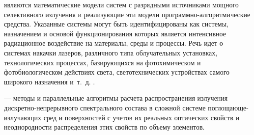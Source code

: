 




 являются математические модели систем с разрядными источниками мощного селективного излучения и реализующие эти модели программно-алгоритмические средства.
Указанные системы могут быть идентифицированы как системы, назначением и основой функционирования которых является интенсивное радиационное воздействие на материалы, среды и процессы.
Речь идет о системах накачки лазеров, различного типа облучательных установках, технологических процессах, базирующихся на фотохимическом и фотобиологическом действиях света, светотехнических устройствах самого широкого назначения и~т.~д. \cite{article-1-marshak, article-2-hancock, article-3-moreau}.

 — методы и параллельные алгоритмы расчета распространения излучения дискретно-непрерывного спектрального состава в сложной системе поглощающе-излучающих сред и поверхностей с учетов их реальных оптических свойств и неоднородности распределения этих свойств по объему элементов.

